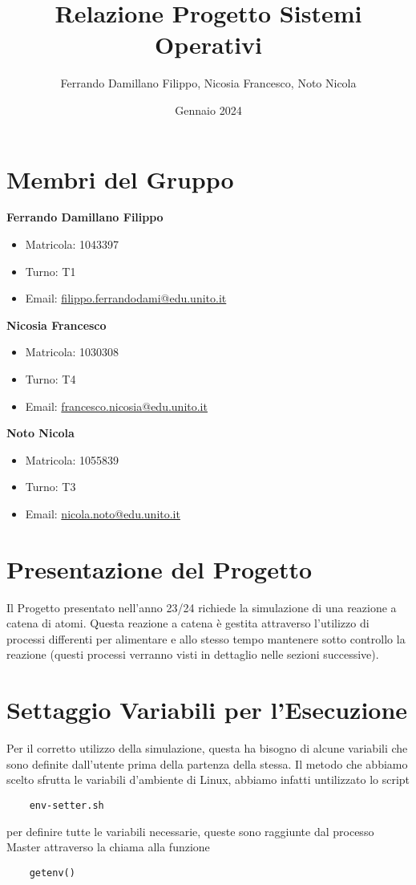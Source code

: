\documentclass{article}
\title{Relazione Progetto Sistemi Operativi}
\author{Ferrando Damillano Filippo, Nicosia Francesco, Noto Nicola}
\date{Gennaio 2024}
\begin{document}
\maketitle

\tableofcontents

\section{Membri del Gruppo}

\textbf{Ferrando Damillano Filippo}
\begin{itemize}
    \item Matricola: 1043397
    \item Turno: T1    
    \item Email: \href{mailto:filippo.ferrandodami@edu.unito.it}{filippo.ferrandodami@edu.unito.it}
\end{itemize}
\textbf{Nicosia Francesco}
\begin{itemize}
    \item Matricola: 1030308
    \item Turno: T4
    \item Email: \href{mailto:francesco.nicosia@edu.unito.it}{francesco.nicosia@edu.unito.it}
\end{itemize}
\textbf{Noto Nicola}
\begin{itemize}
    \item Matricola: 1055839
    \item Turno: T3
    \item Email: \href{mailto:nicola.noto@edu.unito.it}{nicola.noto@edu.unito.it}
\end{itemize}

\section{Presentazione del Progetto}
Il Progetto presentato nell'anno 23/24 richiede la simulazione di una reazione a catena di atomi.
Questa reazione a catena è gestita attraverso l'utilizzo di processi differenti per alimentare e allo stesso tempo mantenere sotto controllo la reazione (questi processi verranno visti in dettaglio nelle sezioni successive).


\section{Settaggio Variabili per l'Esecuzione}
Per il corretto utilizzo della simulazione, questa ha bisogno di alcune variabili che sono definite dall'utente prima della partenza della stessa.
Il metodo che abbiamo scelto sfrutta le variabili d'ambiente di Linux, abbiamo infatti untilizzato lo script
\begin{lstlisting}
    env-setter.sh
\end{lstlisting}
per definire tutte le variabili necessarie, queste sono raggiunte dal processo Master attraverso la chiama alla funzione
\begin{lstlisting}
    getenv()
\end{lstlisting}
\end{document}
